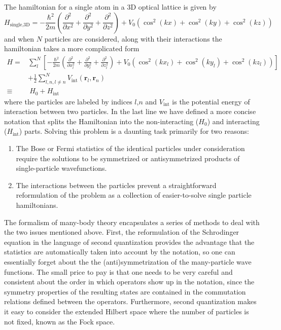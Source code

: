 \documentclass[oneside,11pt]{memoir}
\newcommand{\bv}[1]{\ensuremath{\bm{#1}}}
\newcommand{\vo}{\ensuremath{V_{0}}}
\begin{document}
The hamiltonian for a single atom in a 3D optical lattice is given by  
\begin{equation}
  H_{\text{single,3D}} = - \frac{\hbar^{2}}{2m} \left( \frac{\partial^{2}}{\partial x^{2}}
                            + \frac{\partial^{2}}{\partial y^{2}}
                            + \frac{\partial^{2}}{\partial z^{2}} \right)
 + \vo\left( \cos^{2}(kx)  + \cos^{2}(ky) + \cos^{2}(kz) \right)
\end{equation}
and when $N$ particles are considered, along with their interactions the
hamiltonian takes a more complicated form \begin{equation}
\begin{split}
  H = & \sum_{l}^{N}\left[ 
  -\frac{\hbar^{2}}{2m} \left( \frac{\partial^{2}}{\partial x_{l}^{2}}
                            + \frac{\partial^{2}}{\partial y_{l}^{2}}
                            + \frac{\partial^{2}}{\partial z_{l}^{2}} \right)
 + \vo\left( 
        \cos^{2}(kx_{l})  + \cos^{2}(ky_{l}) + \cos^{2}(kz_{l}) 
      \right) \right]\\
      &  + \frac{1}{2}\sum_{ l,n, l\neq n}^{N} 
              V_{\mathrm{int}}(\bv{r}_{l},\bv{r}_{n} )\\ 
    \equiv & ~ H_{0} + H_{\text{int}}
 \label{eq:hubbard1st}
\end{split} 
\end{equation} 
where the particles are labeled by indices $l$,$n$ and $V_{\mathrm{int}}$ is
the potential energy of interaction between two particles.  In the last line we
have defined a more concise notation that splits the Hamiltonian into the
non-interacting ($H_{0}$) and interacting ($H_{\text{int}}$) parts. Solving
this problem is a daunting task primarily for two reasons:
\begin{enumerate}
    \item The Bose or Fermi statistics of the identical particles under
consideration require the solutions to be symmetrized or antisymmetrized
products of single-particle wavefunctions.     
    \item The interactions between the particles prevent a straightforward
reformulation of the problem as a collection of easier-to-solve single particle
hamiltonians.  
\end{enumerate}

The formalism of many-body theory encapsulates a series of methods to deal with
the two issues mentioned above.   First, the reformulation of the Schrodinger
equation in the language of second quantization provides the advantage that the
statistics are automatically taken into account by the notation, so one can
essentially forget about the the (anti)symmetrization of the many-particle wave
functions.  The small price to pay is that one needs to be very careful and
consistent about the order in which operators show up in the notation, since
the symmetry properties of the resulting states are contained in the
commutation relations defined between the operators.  Furthermore, second
quantization makes it easy to consider the extended Hilbert space where the
number of particles is not fixed, known as the Fock space. 
\end{document}
